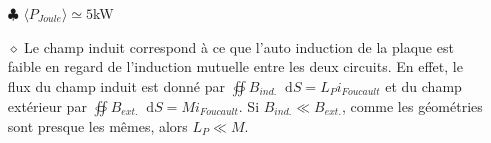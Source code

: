 \documentclass{report}
\newcommand*\dif{\mathop{}\!\mathrm{d}}
\begin{document}
\begin{itemize}
	\item[$\clubsuit$] $\langle P_{Joule}\rangle\simeq5$kW
	
	\item[$\diamond$] Le champ induit correspond à ce que l'auto induction de la plaque est faible en regard de l'induction mutuelle entre les deux circuits. En effet, le flux du champ induit est donné par $\oiint B_{ind.}\dif S=L_Pi_{Foucault}$ et du champ extérieur par $\oiint B_{ext.}\dif S=Mi_{Foucault}$. Si $B_{ind.}\ll B_{ext.}$, comme les géométries sont presque les mêmes, alors $L_P\ll M$.
	
\end{itemize}
\end{document}
